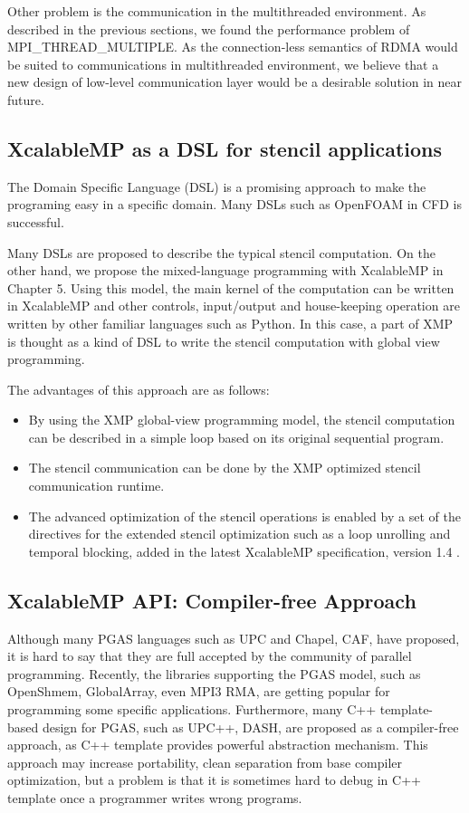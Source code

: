 ﻿\documentclass[graybox]{svmult}
\begin{document}
Other problem is the communication in the multithreaded environment. As described in the previous sections, we found the performance problem of MPI\_THREAD\_MULTIPLE.
As the connection-less semantics of RDMA would be suited to communications in multithreaded environment, we believe that a new design of low-level communication layer would be a desirable solution in near future.

\subsection{XcalableMP as a DSL for stencil applications}

The Domain Specific Language (DSL) is a promising approach to make the programing easy in a specific domain. 
Many DSLs such as OpenFOAM in CFD is successful. 

Many DSLs are proposed to describe the typical stencil computation. On the other hand, we propose the mixed-language programming with XcalableMP in Chapter 5. Using this model, the main kernel of the computation can be written in XcalableMP and other controls, input/output and house-keeping operation are written by other familiar languages such as Python. In this case, a part of XMP is thought as a kind of DSL to write the stencil computation with global view programming.

 The advantages of this approach are as follows:

\begin{itemize}
\item By using the XMP global-view programming model, the stencil computation can be described in a simple loop based on its original sequential program. 
\item The stencil communication can be done by the XMP optimized stencil communication runtime. \cite{Iwashita2018}
\item The advanced optimization of the stencil operations is enabled by a set of the directives for the extended stencil optimization such as a loop unrolling and temporal blocking, added in the latest XcalableMP specification, version 1.4 \cite{XMP-Spec-1-4}.
\end{itemize}

\subsection{XcalableMP API: Compiler-free Approach}

Although many PGAS languages such as UPC and Chapel, CAF, have proposed, it is hard to say that they are full accepted by the community of parallel programming. Recently, the libraries supporting the PGAS model,
such as OpenShmem\cite{OpenShmem}, GlobalArray\cite{GlobalArray}, even MPI3 RMA, are getting popular for programming some specific applications. Furthermore, many C++ template-based design for PGAS,
such as UPC++\cite{UPC++}, DASH\cite{DASH}, are proposed as a compiler-free approach, as C++ template provides powerful abstraction mechanism. This approach may increase portability, clean separation from base compiler optimization, but a problem is that it is sometimes hard to debug in C++ template once a programmer writes wrong programs.
\end{document}
